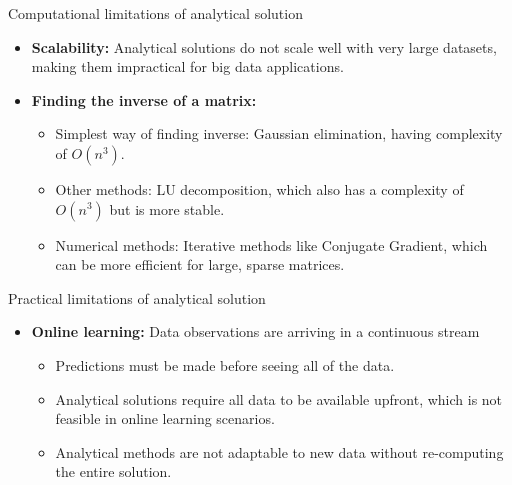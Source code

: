 \documentclass[serif, aspectratio=169]{beamer}
\begin{document}
\begin{frame}{Computational limitations of analytical solution}
    \begin{itemize}
        \item \textbf{Scalability:} Analytical solutions do not scale well with very large datasets, making them impractical for big data applications.
        \item \textbf{Finding the inverse of a matrix:}
        \begin{itemize}
            \item Simplest way of finding inverse: Gaussian elimination, having complexity of \(O(n^3)\).
            \item Other methods: LU decomposition, which also has a complexity of \(O(n^3)\) but is more stable.
            \item Numerical methods: Iterative methods like Conjugate Gradient, which can be more efficient for large, sparse matrices.
        \end{itemize}
    \end{itemize}
\end{frame}

\begin{frame}{Practical limitations of analytical solution}

    \begin{itemize}
        \item \textbf{Online learning:} Data observations are arriving in a continuous stream
        \begin{itemize}
            \item Predictions must be made before seeing all of the data.
            \item Analytical solutions require all data to be available upfront, which is not feasible in online learning scenarios.
            \item Analytical methods are not adaptable to new data without re-computing the entire solution.
        \end{itemize}
    \end{itemize}

\end{frame}
\end{document}
